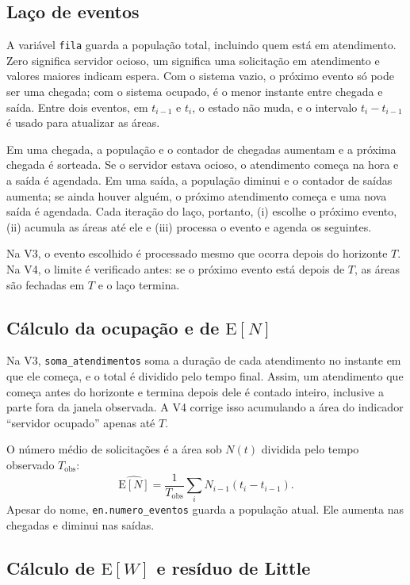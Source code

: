 \documentclass[
  article,      %
  10pt,         %
  oneside,
  a4paper,
  twocolumn,    %
  english,
  brazil        %
]{abntex2}
\newcommand{\EN}{\mathrm{E}[N]}
\newcommand{\EW}{\mathrm{E}[W]}
\begin{document}
\subsection{Laço de eventos}

A variável \texttt{fila} guarda a população total, incluindo quem está em atendimento. Zero significa servidor ocioso, um significa uma solicitação em atendimento e valores maiores indicam espera. Com o sistema vazio, o próximo evento só pode ser uma chegada; com o sistema ocupado, é o menor instante entre chegada e saída. Entre dois eventos, em $t_{i-1}$ e $t_i$, o estado não muda, e o intervalo $t_i-t_{i-1}$ é usado para atualizar as áreas.

Em uma chegada, a população e o contador de chegadas aumentam e a próxima chegada é sorteada. Se o servidor estava ocioso, o atendimento começa na hora e a saída é agendada. Em uma saída, a população diminui e o contador de saídas aumenta; se ainda houver alguém, o próximo atendimento começa e uma nova saída é agendada. Cada iteração do laço, portanto, (i) escolhe o próximo evento, (ii) acumula as áreas até ele e (iii) processa o evento e agenda os seguintes.

Na V3, o evento escolhido é processado mesmo que ocorra depois do horizonte $T$. Na V4, o limite é verificado antes: se o próximo evento está depois de $T$, as áreas são fechadas em $T$ e o laço termina.

\subsection{Cálculo da ocupação e de \texorpdfstring{$\EN$}{E[N]}}

Na V3, \texttt{soma\_atendimentos} soma a duração de cada atendimento no instante em que ele começa, e o total é dividido pelo tempo final. Assim, um atendimento que começa antes do horizonte e termina depois dele é contado inteiro, inclusive a parte fora da janela observada. A V4 corrige isso acumulando a área do indicador ``servidor ocupado'' apenas até $T$.

O número médio de solicitações é a área sob $N(t)$ dividida pelo tempo observado $T_{\mathrm{obs}}$:
\begin{equation}
  \widehat{\EN}=\frac{1}{T_{\mathrm{obs}}}\sum_i N_{i-1}(t_i-t_{i-1}).
\end{equation}
Apesar do nome, \texttt{en.numero\_eventos} guarda a população atual. Ele aumenta nas chegadas e diminui nas saídas.

\subsection{Cálculo de \texorpdfstring{$\EW$}{E[W]} e resíduo de Little}
\label{sec:ew}
\end{document}

